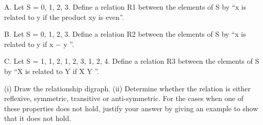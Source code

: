 %
A. Let S = {0, 1, 2, 3}. 
Define a relation R1 between the elements of S by
“x is related to y if the product xy is even”.

B. Let S = {0, 1, 2, 3}. 
Define a relation R2 between the elements of S by
“x is related to y if x − y ”.

C. Let S = {{1}, {1, 2}, {1, 2, 3}, {1, 2, 4}}. 
Define a relation R3 between
the elements of S by “X is related to Y if X \subseteq Y ”.
\begin{frame}
(i) Draw the relationship digraph.
(ii) Determine whether the relation is either reflexive, symmetric, transitive
or anti-symmetric. For the cases when one of these properties
does not hold, justify your answer by giving an example to show that
it does not hold.
\end{frame}
